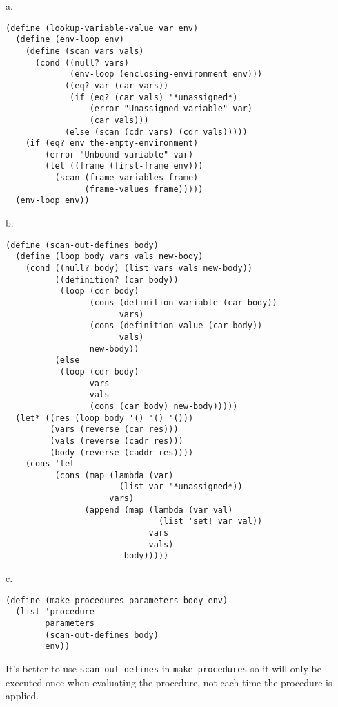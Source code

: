 \documentclass[a4paper,12pt]{article}
\newcommand{\subpar}[1]{\medskip \noindent #1.}
\begin{document}
\subpar{a}
\begin{lstlisting}
(define (lookup-variable-value var env)
  (define (env-loop env)
    (define (scan vars vals)
      (cond ((null? vars)
             (env-loop (enclosing-environment env)))
            ((eq? var (car vars))
             (if (eq? (car vals) '*unassigned*)
                 (error "Unassigned variable" var)
                 (car vals)))
            (else (scan (cdr vars) (cdr vals)))))
    (if (eq? env the-empty-environment)
        (error "Unbound variable" var)
        (let ((frame (first-frame env)))
          (scan (frame-variables frame)
                (frame-values frame)))))
  (env-loop env))
\end{lstlisting}

\subpar{b}
\begin{lstlisting}
(define (scan-out-defines body)
  (define (loop body vars vals new-body)
    (cond ((null? body) (list vars vals new-body))
          ((definition? (car body))
           (loop (cdr body)
                 (cons (definition-variable (car body))
                       vars)
                 (cons (definition-value (car body))
                       vals)
                 new-body))
          (else
           (loop (cdr body)
                 vars
                 vals
                 (cons (car body) new-body)))))
  (let* ((res (loop body '() '() '()))
         (vars (reverse (car res)))
         (vals (reverse (cadr res)))
         (body (reverse (caddr res))))
    (cons 'let
          (cons (map (lambda (var)
                       (list var '*unassigned*))
                     vars)
                (append (map (lambda (var val)
                               (list 'set! var val))
                             vars
                             vals)
                        body)))))
\end{lstlisting}

\subpar{c}

\begin{lstlisting}
(define (make-procedures parameters body env)
  (list 'procedure
        parameters
        (scan-out-defines body)
        env))
\end{lstlisting}

It's better to use \lstinline!scan-out-defines! in
\lstinline!make-procedures! so it will only be executed once when
evaluating the procedure, not each time the procedure is applied.
\end{document}

